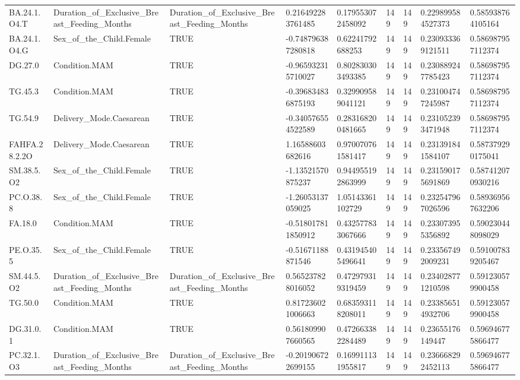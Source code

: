 \begin{longtable}{lllllllll}
BA.24.1.O4.T & Duration\_of\_Exclusive\_Breast\_Feeding\_Months & Duration\_of\_Exclusive\_Breast\_Feeding\_Months & 0.216492283761485 & 0.179553072458092 & 149 & 149 & 0.229899584527373 & 0.585938764105164 \\
BA.24.1.O4.G & Sex\_of\_the\_Child.Female & TRUE & -0.748796387280818 & 0.62241792688253 & 149 & 149 & 0.230933369121511 & 0.586987957112374 \\
DG.27.0 & Condition.MAM & TRUE & -0.965932315710027 & 0.802830303493385 & 149 & 149 & 0.230889247785423 & 0.586987957112374 \\
TG.45.3 & Condition.MAM & TRUE & -0.396834836875193 & 0.329909589041121 & 149 & 149 & 0.231004747245987 & 0.586987957112374 \\
TG.54.9 & Delivery\_Mode.Caesarean & TRUE & -0.340576554522589 & 0.283168200481665 & 149 & 149 & 0.231052393471948 & 0.586987957112374 \\
FAHFA.28.2.2O & Delivery\_Mode.Caesarean & TRUE & 1.16588603682616 & 0.970070761581417 & 149 & 149 & 0.231391841584107 & 0.587379290175041 \\
SM.38.5.O2 & Sex\_of\_the\_Child.Female & TRUE & -1.13521570875237 & 0.944955192863999 & 149 & 149 & 0.231590175691869 & 0.587412070930216 \\
PC.O.38.8 & Sex\_of\_the\_Child.Female & TRUE & -1.26053137059025 & 1.05143361102729 & 149 & 149 & 0.232547967026596 & 0.589369567632206 \\
FA.18.0 & Condition.MAM & TRUE & -0.518017811850912 & 0.432577833067666 & 149 & 149 & 0.233073955356892 & 0.590230448098029 \\
PE.O.35.5 & Sex\_of\_the\_Child.Female & TRUE & -0.51671188871546 & 0.431945405496641 & 149 & 149 & 0.233567492009231 & 0.591007839205467 \\
SM.44.5.O2 & Duration\_of\_Exclusive\_Breast\_Feeding\_Months & Duration\_of\_Exclusive\_Breast\_Feeding\_Months & 0.565237828016052 & 0.472979319319459 & 149 & 149 & 0.234028771210598 & 0.591230579900458 \\
TG.50.0 & Condition.MAM & TRUE & 0.817236021006663 & 0.683593118208011 & 149 & 149 & 0.233856514932706 & 0.591230579900458 \\
DG.31.0.1 & Condition.MAM & TRUE & 0.561809907660565 & 0.472663382284489 & 149 & 149 & 0.23655176149447 & 0.596946775866477 \\
PC.32.1.O3 & Duration\_of\_Exclusive\_Breast\_Feeding\_Months & Duration\_of\_Exclusive\_Breast\_Feeding\_Months & -0.201906722699155 & 0.169911131955817 & 149 & 149 & 0.236668292452113 & 0.596946775866477 \\

\end{longtable}
